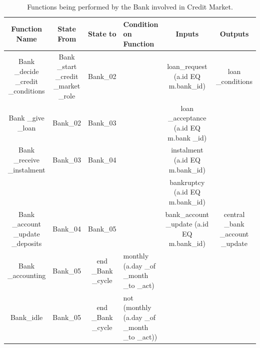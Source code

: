 \begin{landscape}
\begin{table}[!htb]\caption{Functions being performed by the Bank involved in Credit Market.}
\begin{center}
\begin{tabular}{|c|c|c|l|c|c|}
\hline
Function Name & State From & State to & Condition on Function & Inputs & Outputs\\
\hline

{\parbox[l]{3cm}{Bank \_decide \_credit \_conditions}} &
{\parbox[l]{3cm}{Bank \_start \_credit \_market \_role}} & Bank\_02
& & {\parbox[l]{3cm}{loan\_request (a.id EQ m.bank\_id)}} &
{\parbox[l]{3cm}{loan \_conditions}} \\

\hline

{\parbox[l]{3cm}{Bank \_give \_loan}} & Bank\_02 & Bank\_03 & &
{\parbox[l]{3cm}{loan \_acceptance (a.id EQ m.bank \_id)}} & \\

\hline

{\parbox[l]{3cm}{Bank \_receive \_instalment}} & Bank\_03 &
Bank\_04 & &
{\parbox[l]{3cm}{instalment (a.id EQ m.bank\_id)}} & \\

&&&&
{\parbox[l]{3cm}{bankruptcy (a.id EQ m.bank\_id)}} & \\

\hline


{\parbox[l]{3cm}{Bank \_account \_update \_deposits}} & Bank\_04 &
Bank\_05 & & {\parbox[l]{3cm}{bank\_account \_update (a.id EQ
m.bank\_id)}} &
{\parbox[l]{3cm}{central \_bank \_account \_update}}\\

\hline


{\parbox[l]{3cm}{Bank \_accounting}} & Bank\_05 &
{\parbox[l]{3cm}{end \_Bank \_cycle}} &
{\parbox[l]{4cm}{monthly (a.day \_of \_month \_to \_act)}}&  & \\

\hline


{\parbox[l]{3cm}{Bank\_idle}} & Bank\_05 & {\parbox[l]{3cm}{end
\_Bank \_cycle}} &
{\parbox[l]{4cm}{not (monthly (a.day \_of \_month \_to \_act))}}&  & \\
\hline


\end{tabular}\end{center}\label{tab:creditbankmessages}
\end{table}
\end{landscape}

